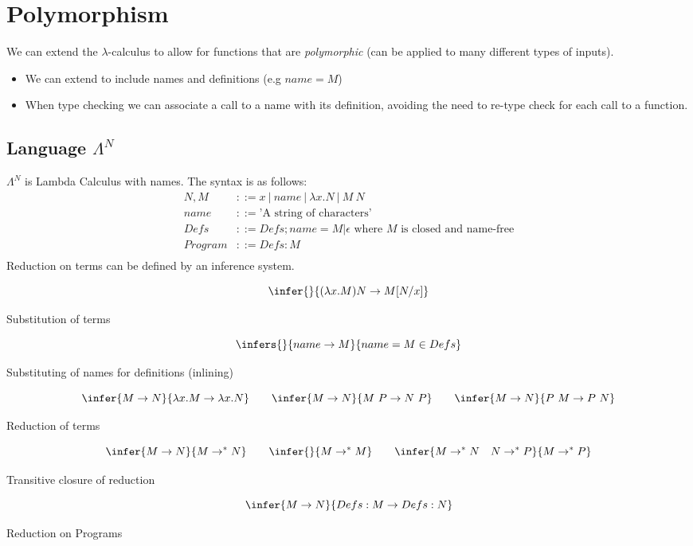 \chapter{Polymorphism}
We can extend the $\lambda$-calculus to allow for functions that are \textit{polymorphic} (can be applied to many different types of inputs).
\begin{itemize}
    \item We can extend to include names and definitions (e.g $name = M$)
    \item When type checking we can associate a call to a name with its definition, avoiding the need to re-type check for each call to a function.
\end{itemize}

\section{Language $\Lambda^N$}
$\Lambda^N$ is Lambda Calculus with names. The syntax is as follows:
\[\begin{split}
    N, M & ::= x \ | \ name \ | \ \lambda x. N \ | \ M \ N \\
    name & ::= \text{'A string of characters'} \\
    Defs & ::= Defs ; name = M | \epsilon \text{ where } M \text{ is closed and name-free}\\ 
    Program & ::= Defs : M \\
\end{split}\]
Reduction on terms can be defined by an inference system.
\\ \begin{minipage}{.48\textwidth}
    \[\infer{}{(\lambda x. M) N \to M[N/x]}\]
    \centerline{Substitution of terms}
\end{minipage}
\hfill
\begin{minipage}{.48\textwidth}
    \[\infers{}{name \to M}{name = M \in Defs}\]
    \centerline{Substituting of names for definitions (inlining)}
\end{minipage}
\vspace{2mm}
\[\infer{M \to N}{\lambda x . M \to \lambda x . N} 
\qquad \infer{M \to N}{M \ P \to N \ P}
\qquad \infer{M \to N}{P \ M \to P \ N}\]
\centerline{Reduction of terms}

\[\infer{M \to N}{M \to^* N}
\qquad \infer{}{M \to^* M}
\qquad \infer{M \to^* N \quad N \to^* P}{M \to^* P}\]
\centerline{Transitive closure of reduction}

\[\infer{M \to N}{Defs : M \to Defs : N}\]
\centerline{Reduction on Programs}

